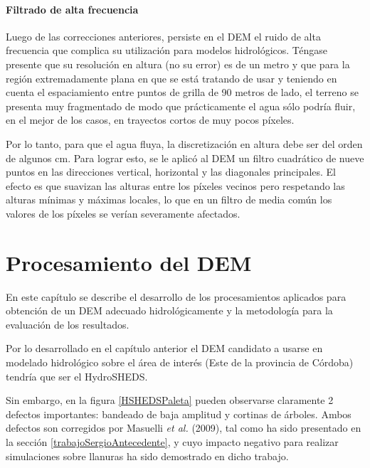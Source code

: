 \documentclass[10pt,a4paper, twoside]{report}
\begin{document}
\subsubsection{Filtrado de alta frecuencia}

Luego de las correcciones anteriores, persiste en el DEM el ruido de alta frecuencia que complica su utilización para modelos hidrológicos. Téngase presente que su resolución en altura (no su error) es de un metro y que para la región extremadamente plana en que se está tratando de usar y teniendo en cuenta el espaciamiento entre puntos de grilla de 90 metros de lado, el terreno se presenta muy fragmentado de modo que prácticamente el agua sólo podría fluir, en el mejor de los casos, en trayectos cortos de muy pocos píxeles.

Por lo tanto, para que el agua fluya, la discretización en altura debe ser del orden de algunos cm. Para lograr esto, se le aplicó al DEM un filtro cuadrático de nueve puntos en las direcciones vertical, horizontal y las diagonales principales. El efecto es que suavizan las alturas entre los píxeles vecinos pero respetando las alturas mínimas y máximas locales, lo que en un filtro de media común los valores de los píxeles se verían severamente afectados.


\chapter{Procesamiento del DEM}
\label{chap:procDEM}

En este capítulo se describe el desarrollo de los procesamientos aplicados para obtención de un DEM adecuado hidrológicamente y la metodología para la evaluación de los resultados.


Por lo desarrollado en el capítulo anterior el DEM candidato a usarse en modelado hidrológico sobre el área de interés (Este de la provincia de Córdoba) tendría que ser el HydroSHEDS.

Sin embargo, en la figura \ref{HSHEDSPaleta} pueden observarse claramente 2 defectos importantes: bandeado de baja amplitud y cortinas de árboles. Ambos defectos son corregidos por Masuelli \textit{et al.} (2009), tal como ha sido presentado en la sección \ref{trabajoSergioAntecedente}, y cuyo impacto negativo para realizar simulaciones sobre llanuras ha sido demostrado en dicho trabajo.
\end{document}
